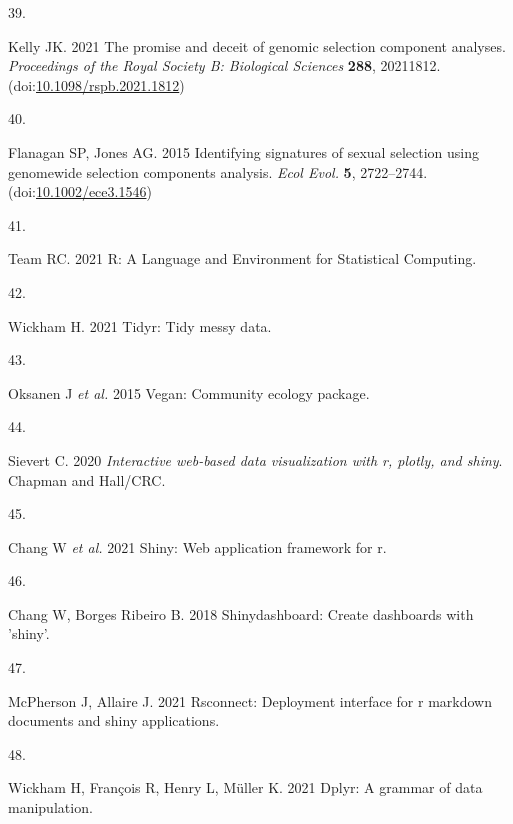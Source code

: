 \documentclass[
  11pt,
  a4paper,
]{article}
\newlength{\cslhangindent}
\newlength{\csllabelwidth}
\newlength{\cslentryspacingunit} %
\newenvironment{CSLReferences}[2] %
 {%
  \setlength{\parindent}{0pt}
  \ifodd #1
  \let\oldpar\par
  \def\par{\hangindent=\cslhangindent\oldpar}
  \fi
  \setlength{\parskip}{#2\cslentryspacingunit}
 }%
 {}
\newcommand{\CSLLeftMargin}[1]{\parbox[t]{\csllabelwidth}{#1}}
\newcommand{\CSLRightInline}[1]{\parbox[t]{\linewidth - \csllabelwidth}{#1}\break}
\begin{document}
\begin{CSLReferences}{0}{0}
\leavevmode{}%
\CSLLeftMargin{39. }%
\CSLRightInline{Kelly JK. 2021 The promise and deceit of genomic selection component analyses. \emph{Proceedings of the Royal Society B: Biological Sciences} \textbf{288}, 20211812. (doi:\href{https://doi.org/10.1098/rspb.2021.1812}{10.1098/rspb.2021.1812})}

\leavevmode{}%
\CSLLeftMargin{40. }%
\CSLRightInline{Flanagan SP, Jones AG. 2015 Identifying signatures of sexual selection using genomewide selection components analysis. \emph{Ecol Evol.} \textbf{5}, 2722--2744. (doi:\href{https://doi.org/10.1002/ece3.1546}{10.1002/ece3.1546})}

\leavevmode{}%
\CSLLeftMargin{41. }%
\CSLRightInline{Team RC. 2021 R: {A Language} and {Environment} for {Statistical Computing}. }

\leavevmode{}%
\CSLLeftMargin{42. }%
\CSLRightInline{Wickham H. 2021 Tidyr: {Tidy} messy data. }

\leavevmode{}%
\CSLLeftMargin{43. }%
\CSLRightInline{Oksanen J \emph{et al.} 2015 Vegan: Community ecology package. }

\leavevmode{}%
\CSLLeftMargin{44. }%
\CSLRightInline{Sievert C. 2020 \emph{Interactive web-based data visualization with r, plotly, and shiny}. {Chapman and Hall/CRC}. }

\leavevmode{}%
\CSLLeftMargin{45. }%
\CSLRightInline{Chang W \emph{et al.} 2021 Shiny: {Web} application framework for r. }

\leavevmode{}%
\CSLLeftMargin{46. }%
\CSLRightInline{Chang W, Borges Ribeiro B. 2018 Shinydashboard: {Create} dashboards with 'shiny'. }

\leavevmode{}%
\CSLLeftMargin{47. }%
\CSLRightInline{McPherson J, Allaire J. 2021 Rsconnect: {Deployment} interface for r markdown documents and shiny applications. }

\leavevmode{}%
\CSLLeftMargin{48. }%
\CSLRightInline{Wickham H, François R, Henry L, Müller K. 2021 Dplyr: {A} grammar of data manipulation. }


\end{CSLReferences}
\end{document}
